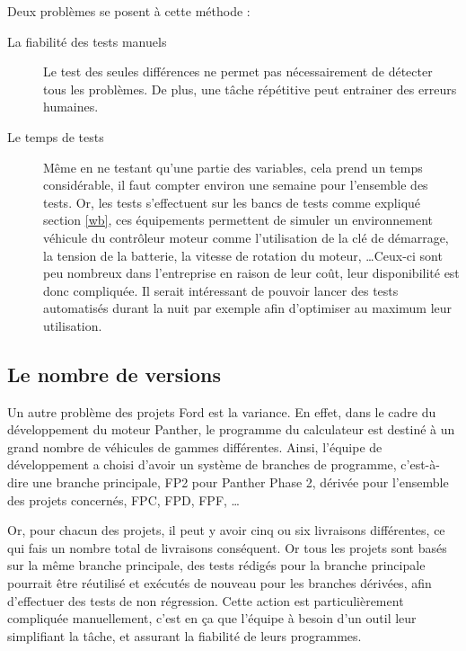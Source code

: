 	\vspace{20px}
	Deux problèmes se posent à cette méthode : 
	\begin{description}
		\item[La fiabilité des tests manuels] Le test des seules différences ne permet pas nécessairement de détecter tous les problèmes. De plus, une tâche répétitive peut entrainer des erreurs humaines.
		\item[Le temps de tests] Même en ne testant qu'une partie des variables, cela prend un temps considérable, il faut compter environ une semaine pour l'ensemble des tests.\newline
			Or, les tests s'effectuent sur les bancs de tests comme expliqué section \ref{wb}, ces équipements permettent de simuler un environnement véhicule du contrôleur moteur comme
			l'utilisation de la clé de démarrage, la tension de la batterie, la vitesse de rotation du moteur, \ldots Ceux-ci sont peu
			nombreux dans l'entreprise en raison de leur coût, leur disponibilité est donc compliquée. Il serait intéressant de pouvoir lancer
			des tests automatisés durant la nuit par exemple afin d'optimiser au maximum leur utilisation.
	\end{description}
	
	\subsection{Le nombre de versions}
	Un autre problème des projets Ford est la variance. En effet, dans le cadre du développement du moteur Panther, le programme du calculateur est destiné à un grand nombre de véhicules de gammes différentes. Ainsi, l'équipe de développement a choisi d'avoir un système de branches de programme, c'est-à-dire une branche principale, FP2 pour Panther Phase 2, dérivée pour l'ensemble des projets concernés, FPC, FPD, FPF, \ldots
	
	Or, pour chacun des projets, il peut y avoir cinq ou six livraisons différentes, ce qui fais un nombre total de livraisons conséquent. Or tous les projets sont basés sur la même branche principale, des tests rédigés pour la branche principale pourrait être réutilisé et exécutés de nouveau pour les branches dérivées, afin d'effectuer des tests de non régression. Cette action est particulièrement compliquée manuellement, c'est en ça que l'équipe à besoin d'un outil leur simplifiant la tâche, et assurant la fiabilité de leurs programmes.
	
